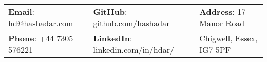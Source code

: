 \documentclass[letterpaper, 11pt]{article}
\begin{document}


\vspace{0.5cm} 
\begin{center}
\begin{tabular}{lll}
\textbf{Email}: hd@hashadar.com      &
\hspace{0.4in} \textbf{GitHub}: github.com/hashadar    &
\hspace{0.3in} 	\textbf{Address}: 17 Manor Road \\

\textbf{Phone}: +44 7305 576221   & 
\hspace{0.4in} \textbf{LinkedIn}: linkedin.com/in/hdar/   & 
\hspace{0.3in} Chigwell, Essex, IG7 5PF 
\end{tabular}
\end{center}


\setlength{\tabcolsep}{8pt}
\end{document}
